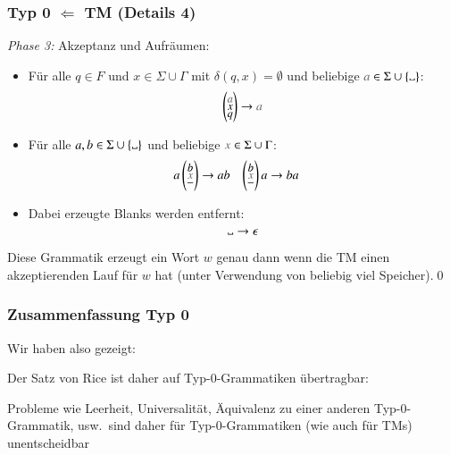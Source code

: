 \documentclass[aspectratio=1610,onlymath]{beamer}
\begin{document}
\begin{frame}\frametitle{Typ 0 $\Leftarrow$ TM (Details 4)}

\emph{Phase 3:} Akzeptanz und Aufräumen:

\begin{itemize}
\item Für alle $q\in F$ und $x\in\Sigma\cup\Gamma$ mit $\delta(q,x)=\emptyset$ und beliebige $\unemph{a}\in\Sigma\cup\{\blank\}$:\vspace{-0.5ex}
\[ \vtriple{\unemph{a}}{x}{q} \to \unemph{a} \]\vspace{-1.5ex}\pause
%
\item Für alle $a,b\in\Sigma\cup\{\blank\}$ und beliebige $\unemph{x}\in\Sigma\cup\Gamma$:
\begin{align*}
a\vtriple{b}{\unemph{x}}{-} &\to ab &
\vtriple{b}{\unemph{x}}{-}a &\to ba
\end{align*}\vspace{-1.5ex}\pause%
%
\item Dabei erzeugte Blanks werden entfernt:\vspace{-0.5ex}
\[\blank \to \epsilon\]\vspace{-3.5ex}
\end{itemize}\pause

Diese Grammatik erzeugt ein Wort $w$ genau dann wenn die TM einen akzeptierenden Lauf für $w$ hat (unter Verwendung von 
beliebig viel Speicher).\qed\bigskip

\end{frame}

\begin{frame}\frametitle{Zusammenfassung Typ 0}

Wir haben also gezeigt:\medskip

\medskip

Der Satz von Rice ist daher auf Typ-0-Grammatiken übertragbar:


Probleme wie Leerheit, Universalität, Äquivalenz zu einer anderen Typ-0-Grammatik, usw.\ sind daher für Typ-0-Grammatiken (wie auch für TMs) unentscheidbar

\end{frame}
\end{document}
